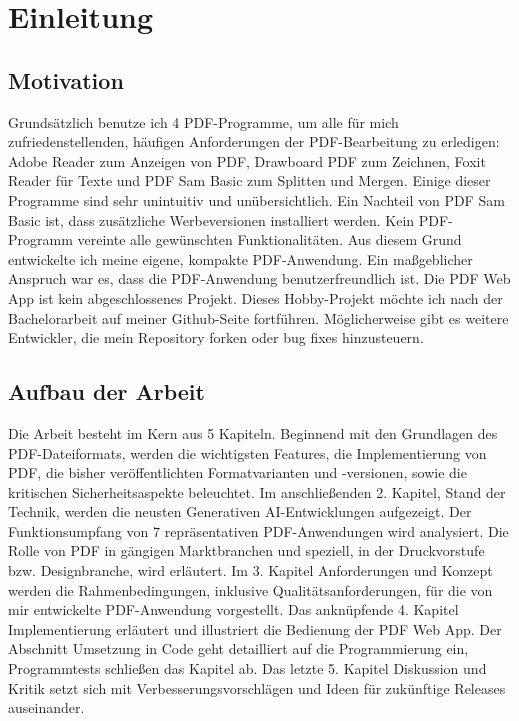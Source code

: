 \chapter{Einleitung}

\section{Motivation}
Grundsätzlich benutze ich 4 PDF-Programme, um alle für mich zufriedenstellenden, häufigen Anforderungen der PDF-Bearbeitung zu erledigen: Adobe Reader zum Anzeigen von PDF, Drawboard PDF zum Zeichnen, Foxit Reader für Texte und PDF Sam Basic zum Splitten und Mergen. Einige dieser Programme sind sehr unintuitiv und unübersichtlich. Ein Nachteil von PDF Sam Basic ist, dass zusätzliche Werbeversionen installiert werden. Kein PDF-Programm vereinte alle gewünschten Funktionalitäten. Aus diesem Grund entwickelte ich meine eigene, kompakte PDF-Anwendung. Ein maßgeblicher Anspruch war es, dass die PDF-Anwendung benutzerfreundlich ist. Die PDF Web App ist kein abgeschlossenes Projekt. Dieses Hobby-Projekt möchte ich nach der Bachelorarbeit auf meiner Github-Seite fortführen. Möglicherweise gibt es weitere Entwickler, die mein Repository forken oder bug fixes hinzusteuern.

\section{Aufbau der Arbeit}
Die Arbeit besteht im Kern aus 5 Kapiteln. Beginnend mit den Grundlagen des PDF-Dateiformats, werden die wichtigsten Features, die Implementierung von PDF, die bisher veröffentlichten Formatvarianten und -versionen, sowie die kritischen Sicherheitsaspekte beleuchtet. Im anschließenden 2. Kapitel, Stand der Technik, werden die neusten Generativen AI-Entwicklungen aufgezeigt. Der Funktionsumpfang von 7 repräsentativen PDF-Anwendungen wird analysiert. Die Rolle von PDF in gängigen Marktbranchen und speziell, in der Druckvorstufe bzw. Designbranche, wird erläutert. Im 3. Kapitel Anforderungen und Konzept werden die Rahmenbedingungen, inklusive Qualitätsanforderungen, für die von mir entwickelte PDF-Anwendung vorgestellt. Das anknüpfende 4. Kapitel Implementierung erläutert und illustriert die Bedienung der PDF Web App. Der Abschnitt Umsetzung in Code geht detailliert auf die Programmierung ein, Programmtests schließen das Kapitel ab. Das letzte 5. Kapitel Diskussion und Kritik setzt sich mit Verbesserungsvorschlägen und Ideen für zukünftige Releases auseinander. 